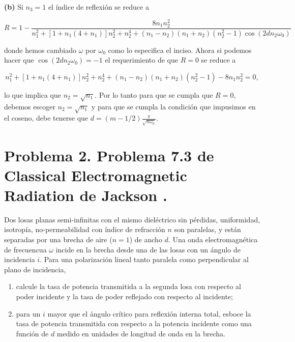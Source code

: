 \documentclass[a4paper,11pt]{article}
\numberwithin{equation}{section}
\begin{document}
\textbf{(b)} Si $n_3 = 1$ el índice de reflexión se reduce a 

\begin{equation}
 R = 1 - \frac{8n_1 n_2^2}{n_1^2 + [1 + n_1(4 + n_1)]n_2^2 + n_2^4 + 
 (n_1 - n_2)(n_1 + n_2)(n_2^2 - 1)\cos{(2 d n_2 \omega_0)}}
\end{equation}

donde hemos cambiado $\omega$ por $\omega_0$ como lo especifica el inciso. Ahora 
si podemos hacer que $\cos{(2 d n_2 \omega_0)} = -1$ el requerimiento de que $R = 0$ 
se reduce a 

\begin{equation}
 n_1^2 + [1 + n_1(4 + n_1)]n_2^2 + n_2^4 + 
 (n_1 - n_2)(n_1 + n_2)(n_2^2 - 1) - 8n_1 n_2^2 = 0,
\end{equation}

lo que implica que $n_2 = \sqrt{n_1}$. Por lo tanto para que se cumpla que $R=0$, debemos 
escoger $n_2 = \sqrt{n_1}$ y para que se cumpla la condición que impusimos en el 
coseno, debe tenerse que $d = (m - 1/2)\frac{\pi}{\sqrt{n\omega_0}}$.

\newpage

\section{Problema 2. Problema 7.3 de Classical Electromagnetic Radiation
de Jackson \cite{jackson}.}

Dos losas planas semi-infinitas con el mismo dieléctrico sin pérdidas, uniformidad,
isotropía, no-permeabilidad con índice de refracción $n$ son paralelas, y están 
separadas por una brecha de aire ($n = 1$) de ancho $d$. Una onda electromagnética 
de frecuencua $\omega$ incide en la brecha desde una de las losas con un ángulo 
de incidencia $i$. Para una polarización lineal tanto paralela como perpendicular 
al plano de incidencia,

\begin{enumerate}[label=\textbf{(\alph*)}]
 \item calcule la tasa de potencia transmitida a la segunda losa con respecto 
 al poder incidente y la tasa de poder reflejado con respecto al incidente;
 \item para un $i$ mayor que el ángulo crítico para reflexión interna total, 
 esboce la tasa de potencia transmitida con respecto a la potencia incidente 
 como una función de $d$ medido en unidades de longitud de onda en la brecha.
\end{enumerate}
\end{document}
